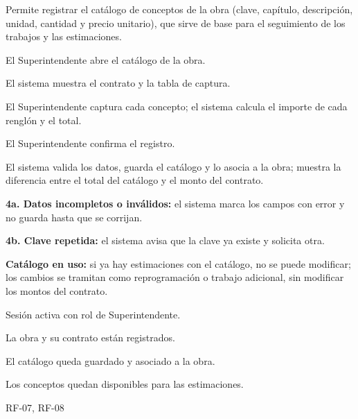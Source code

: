 {Permite registrar el catálogo de conceptos de la obra (clave, capítulo, descripción, unidad, cantidad y precio unitario), que sirve de base para el seguimiento de los trabajos y las estimaciones.}
{\item El Superintendente abre el catálogo de la obra.
 \item El sistema muestra el contrato y la tabla de captura.
 \item El Superintendente captura cada concepto; el sistema calcula el importe de cada renglón y el total.
 \item El Superintendente confirma el registro.
 \item El sistema valida los datos, guarda el catálogo y lo asocia a la obra; muestra la diferencia entre el total del catálogo y el monto del contrato.}
{\item \textbf{4a. Datos incompletos o inválidos:} el sistema marca los campos con error y no guarda hasta que se corrijan.
 \item \textbf{4b. Clave repetida:} el sistema avisa que la clave ya existe y solicita otra.
 \item \textbf{Catálogo en uso:} si ya hay estimaciones con el catálogo, no se puede modificar; los cambios se tramitan como reprogramación o trabajo adicional, sin modificar los montos del contrato.}
{\item Sesión activa con rol de Superintendente.
 \item La obra y su contrato están registrados.}
{\item El catálogo queda guardado y asociado a la obra.
 \item Los conceptos quedan disponibles para las estimaciones.}
{RF-07, RF-08}

